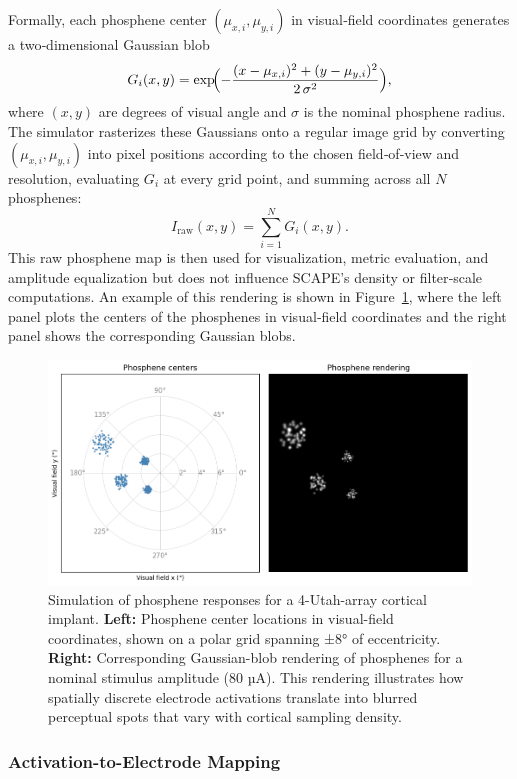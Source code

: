 Formally, each phosphene center \((\mu_{x,i},\mu_{y,i})\) in visual‐field coordinates generates a two‐dimensional Gaussian blob
\[
G_i(x,y)
=
\exp\!\Bigl(-\frac{(x-\mu_{x,i})^2 + (y-\mu_{y,i})^2}{2\,\sigma^2}\Bigr),
\]
where \((x,y)\) are degrees of visual angle and \(\sigma\) is the nominal phosphene radius. The simulator rasterizes these Gaussians onto a regular image grid by converting \((\mu_{x,i},\mu_{y,i})\) into pixel positions according to the chosen field‐of‐view and resolution, evaluating \(G_i\) at every grid point, and summing across all \(N\) phosphenes:
\[
I_{\mathrm{raw}}(x,y)
=
\sum_{i=1}^{N} G_i(x,y).
\]
This raw phosphene map is then used for visualization, metric evaluation, and amplitude equalization but does not influence SCAPE’s density or filter‐scale computations. An example of this rendering is shown in Figure~\ref{fig:phosphene-rendering}, where the left panel plots the centers of the phosphenes in visual‐field coordinates and the right panel shows the corresponding Gaussian blobs.

\begin{figure}[h]
  \centering
  \includegraphics[width=0.9\columnwidth]{figures/phosphenerendering4utaharrays.png}
  \caption{Simulation of phosphene responses for a 4-Utah-array cortical implant. \textbf{Left:} Phosphene center locations in visual-field coordinates, shown on a polar grid spanning ±8° of eccentricity. \textbf{Right:} Corresponding Gaussian-blob rendering of phosphenes for a nominal stimulus amplitude (80 µA). This rendering illustrates how spatially discrete electrode activations translate into blurred perceptual spots that vary with cortical sampling density.}
  \label{fig:phosphene-rendering}
\end{figure}


\subsubsection{Activation-to-Electrode Mapping}

